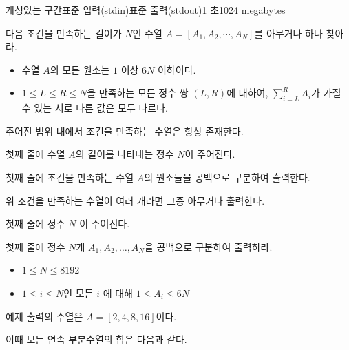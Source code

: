 \def\probtitle{개성있는 구간}
\def\probno{PB} %

\begin{problem}{\probtitle}{표준 입력(stdin)}{표준 출력(stdout)}{1 초}{1024 megabytes}

다음 조건을 만족하는 길이가 $N$인 수열 $A = [A_1, A_2, \cdots, A_N]$를 아무거나 하나 찾아라.

\begin{itemize}[topsep=0pt,noitemsep]
    \item 수열 $A$의 모든 원소는 $1$ 이상 $6N$ 이하이다.
    \item $1 \le L \le R \le N$을 만족하는 모든 정수 쌍 $(L, R)$에 대하여, $\sum\limits_{i=L}^R A_i$가 가질 수 있는 서로 다른 값은 모두 다르다.
\end{itemize}

주어진 범위 내에서 조건을 만족하는 수열은 항상 존재한다.

\InputFile

첫째 줄에 수열 $A$의 길이를 나타내는 정수 $N$이 주어진다.

\OutputFile

첫째 줄에 조건을 만족하는 수열 $A$의 원소들을 공백으로 구분하여 출력한다.

위 조건을 만족하는 수열이 여러 개라면 그중 아무거나 출력한다.

\InputFile

첫째 줄에 정수 $N$ 이 주어진다.

\OutputFile

첫째 줄에 정수 $N$개 $A_1, A_2, \dots, A_N$을 공백으로 구분하여 출력하라.

\Constraints

\begin{itemize}[topsep=0pt,noitemsep]
    \item $1 \le N \le 8192$
    \item $1 \le i \le N$인 모든 $i$ 에 대해 $1 \le A_i \le 6N$
\end{itemize}

\Example

\begin{example}
\end{example}

\Notes

예제 출력의 수열은 $A = [2, 4, 8, 16]$이다.

이때 모든 연속 부분수열의 합은 다음과 같다.


\end{problem}
